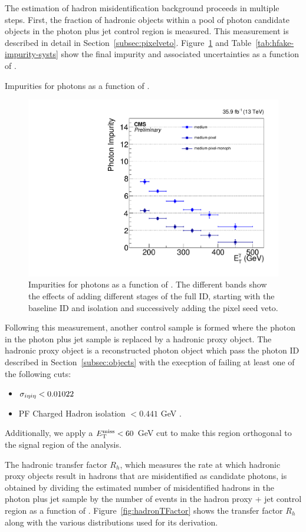 The estimation of hadron misidentification background proceeds in multiple steps. 
First, the fraction of hadronic objects within a pool of photon candidate objects in the photon plus jet control region is measured. 
This measurement is described in detail in Section~\ref{subsec:pixelveto}.
Figure~\ref{fig:impurity-compsb} and Table~\ref{tab:hfake-impurity-systs} show the final impurity and associated uncertainties as a function of \pt. 

\begin{table}[htbp]
  \centering
  
  \caption{Impurities for photons as a function of \pt.}
  \label{tab:hfake-impurity-systs}
\end{table}

\begin{figure}[htbp]
  \centering
  \includegraphics[width=0.45\linewidth]{Analysis/Figures/hfake/plot_impurity_barrel_medium.pdf}
    \caption{
    Impurities for photons as a function of \pt. 
    The different bands show the effects of adding different stages of the full ID, starting with the baseline ID and isolation and successively adding the pixel seed veto.
  }
  \label{fig:impurity-compsb}
\end{figure}

Following this measurement, another control sample is formed where the photon in the photon plus jet sample is replaced by a hadronic proxy object. 
The hadronic proxy object is a reconstructed photon object which pass the photon ID described in Section~\ref{subsec:objects} with the execption of failing at least one of the following cuts: 
\begin{itemize}
\item $\sigma_{i\eta i\eta} < 0.01022$
\item PF Charged Hadron isolation $< 0.441$ GeV .
\end{itemize}
Additionally, we apply a $E_{\mathrm{T}}^{\text{miss}} < 60$ GeV cut to make this region orthogonal to the signal region of the analysis.
  
The hadronic transfer factor $R_{h}$, which measures the rate at which hadronic proxy objects result in hadrons that are misidentified as candidate photons, is obtained by dividing the estimated number of misidentified hadrons in the photon plus jet sample by the number of events in the hadron proxy + jet control region as a function of \pt. 
Figure~\ref{fig:hadronTFactor} shows the transfer factor $R_{h}$ along with the various distributions used for its derivation.

